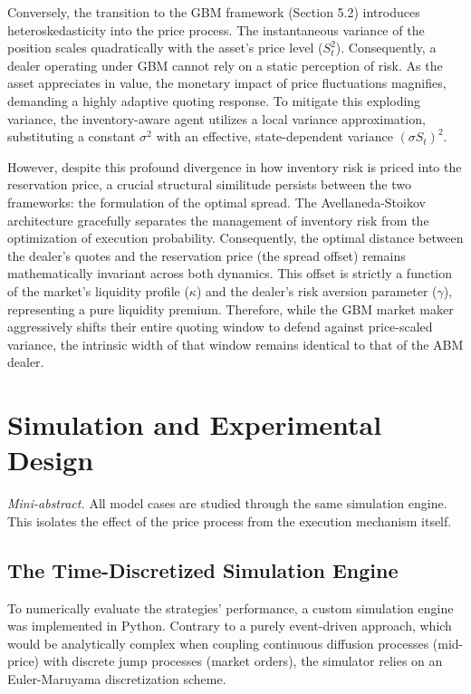 \documentclass[a4paper,10pt,titlepage,oneside,openany]{book}
\theoremstyle{plain}\newtheorem{theorem}{Theorem}[chapter]
\theoremstyle{definition}\newtheorem{definition}{Definition}[chapter]
\theoremstyle{remark}\newtheorem{remark}{Remark}[chapter]
\newcommand{\miniabstract}[1]{%
\vspace{-2pt}
\begin{tcolorbox}[colback=gray!6,colframe=black!15,boxrule=0.3pt,arc=3pt,left=6pt,right=6pt,top=4pt,bottom=4pt]
\textit{Mini-abstract.} #1
\end{tcolorbox}
\vspace{-4pt}
}
\begin{document}
Conversely, the transition to the GBM framework (Section 5.2) introduces heteroskedasticity into the price process. The instantaneous variance of the position scales quadratically with the asset's price level ($S_t^2$). Consequently, a dealer operating under GBM cannot rely on a static perception of risk. As the asset appreciates in value, the monetary impact of price fluctuations magnifies, demanding a highly adaptive quoting response. To mitigate this exploding variance, the inventory-aware agent utilizes a local variance approximation, substituting a constant $\sigma^2$ with an effective, state-dependent variance $(\sigma S_t)^2$.

However, despite this profound divergence in how inventory risk is priced into the reservation price, a crucial structural similitude persists between the two frameworks: the formulation of the optimal spread. The Avellaneda-Stoikov architecture gracefully separates the management of inventory risk from the optimization of execution probability. Consequently, the optimal distance between the dealer's quotes and the reservation price (the spread offset) remains mathematically invariant across both dynamics. This offset is strictly a function of the market's liquidity profile ($\kappa$) and the dealer's risk aversion parameter ($\gamma$), representing a pure liquidity premium. Therefore, while the GBM market maker aggressively shifts their entire quoting window to defend against price-scaled variance, the intrinsic width of that window remains identical to that of the ABM dealer.

\chapter{Simulation and Experimental Design}
\miniabstract{All model cases are studied through the same simulation engine. This isolates the effect of the price process from the execution mechanism itself.}

\section{The Time-Discretized Simulation Engine}
To numerically evaluate the strategies' performance, a custom simulation engine was implemented in Python. Contrary to a purely event-driven approach, which would be analytically complex when coupling continuous diffusion processes (mid-price) with discrete jump processes (market orders), the simulator relies on an Euler-Maruyama discretization scheme.
\end{document}

